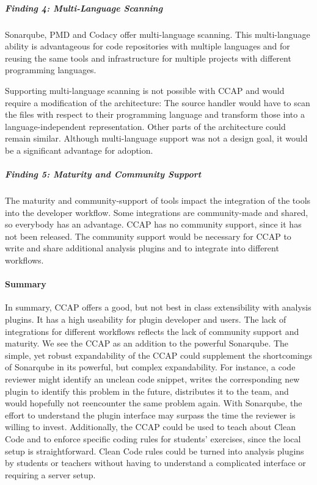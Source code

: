 \subparagraph{Finding 4: Multi-Language Scanning}
Sonarqube, PMD and Codacy offer multi-language scanning. This multi-language ability is advantageous for code repositories with multiple languages and for reusing the same tools and infrastructure for multiple projects with different programming languages. 

Supporting multi-language scanning is not possible with CCAP and would require a modification of the architecture: The source handler would have to scan the files with respect to their programming language and transform those into a language-independent representation. Other parts of the architecture could remain similar. Although multi-language support was not a design goal, it would be a significant advantage for adoption.

\subparagraph{Finding 5: Maturity and Community Support}
The maturity and community-support of tools impact the integration of the tools into the developer workflow. Some integrations are community-made and shared, so everybody has an advantage. 
CCAP has no community support, since it has not been released. The community support would be necessary for CCAP to write and share additional analysis plugins and to integrate into different workflows. 

\paragraph{Summary}
In summary, CCAP offers a good, but not best in class extensibility with analysis plugins. It has a high useability for plugin developer and users. The lack of integrations for different workflows reflects the lack of community support and maturity. 
We see the CCAP as an addition to the powerful Sonarqube. The simple, yet robust expandability of the CCAP could supplement the shortcomings of Sonarqube in its powerful, but complex expandability. For instance, a code reviewer might identify an unclean code snippet, writes the corresponding new plugin to identify this problem in the future, distributes it to the team, and would hopefully not reencounter the same problem again. With Sonarqube, the effort to understand the plugin interface may surpass the time the reviewer is willing to invest.
Additionally, the CCAP could be used to teach about Clean Code and to enforce specific coding rules for students' exercises, since the local setup is straightforward. Clean Code rules could be turned into analysis plugins by students or teachers without having to understand a complicated interface or requiring a server setup.

